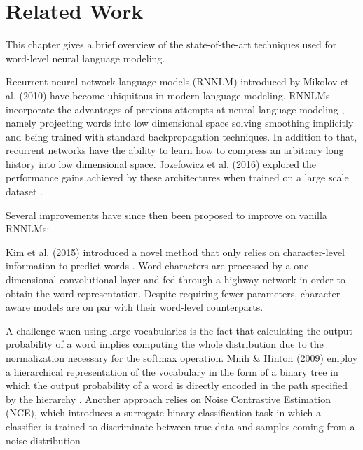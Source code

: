 \chapter{Related Work}

This chapter gives a brief overview of the state-of-the-art techniques used for word-level neural language modeling.

Recurrent neural network language models (RNNLM) \cite{mikolov2010recurrent} introduced by Mikolov et al. (2010) have become ubiquitous in modern language modeling. RNNLMs incorporate the advantages of previous attempts at neural language modeling \cite{bengio2003neural}, namely projecting words into low dimensional space solving smoothing implicitly and being trained with standard backpropagation techniques. In addition to that, recurrent networks have the ability to learn how to compress an arbitrary long history into low dimensional space. Jozefowicz et al. (2016) explored the performance gains achieved by these architectures when trained on a large scale dataset \cite{jozefowicz2016exploring}.

Several improvements have since then been proposed to improve on vanilla RNNLMs:

Kim et al. (2015) introduced a novel method that only relies on character-level information to predict words \cite{kim2016character}. Word characters are processed by a one-dimensional convolutional layer and fed through a highway network in order to obtain the word representation. Despite requiring fewer parameters, character-aware models are on par with their word-level counterparts.

A challenge when using large vocabularies is the fact that calculating the output probability of a word implies computing the whole distribution due to the normalization necessary for the softmax operation. Mnih \& Hinton (2009) employ a hierarchical representation of the vocabulary in the form of a binary tree in which the output probability of a word is directly encoded in the path specified by the hierarchy \cite{mnih2009scalable}. Another approach relies on Noise Contrastive Estimation (NCE), which introduces a surrogate binary classification task in which a classifier is trained to discriminate between true data and samples coming from a noise distribution \cite{mnih2012fast}.

